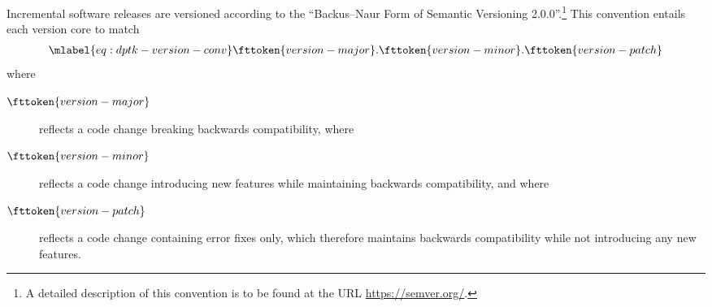 %
Incremental software releases are versioned according to the \enquote{Backus–Naur Form of Semantic Versioning 2.0.0}.\footnote{A detailed description of this convention is to be found at the URL \href{https://semver.org/}{https://semver.org/}.} This convention entails each version core to match
\begin{align}\mlabel{eq:dptk-version-conv}
  \fttoken{version-major}.\fttoken{version-minor}.\fttoken{version-patch}
\end{align}
where
\begin{description}
  \item[$\fttoken{version-major}$] reflects a code change breaking backwards compatibility, where
  \item[$\fttoken{version-minor}$] reflects a code change introducing new features while maintaining backwards compatibility, and where
  \item[$\fttoken{version-patch}$] reflects a code change containing error fixes only, which therefore maintains backwards compatibility while not introducing any new features.
\end{description}
